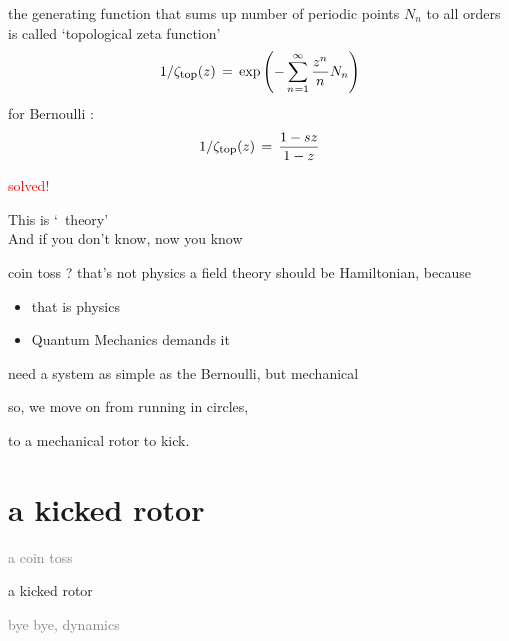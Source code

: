 \begin{frame}{\tzeta}
the {\color{blue}generating function} that sums up number of periodic
points $N_n$ to all orders is called {\color{blue}`topological zeta
function'}
\[
1/\zeta_{\mbox{\footnotesize top}} (z)
 \,=\,  \exp \left(-\sum_{{n_{}}=1}^\infty
\frac{z^{n_{}}}{{n_{}}} N_n
         \right)
\] %
for Bernoulli :
\[
1/\zeta_{\mbox{\footnotesize top}} (z)
\,=\,
\frac{1 -  {s}z}{1 - z}
\]
%
%

\vfill
\hfill {\Huge \textcolor{red}{solved!}}
\vfill

This is `\po\ theory'
\\
 And if you don't know,
 {now you know}

\end{frame}

\begin{frame}{coin toss ? that's not physics}
a field theory should be Hamiltonian, because
\bigskip

\begin{itemize}
  \item
that is physics
  \item
Quantum Mechanics demands it
\end{itemize}
\bigskip

need a system as simple
as the Bernoulli, but {\color{blue}mechanical}
\bigskip

so, we move on from running in circles,

\hfill
to a mechanical {\color{blue}rotor} to kick.
\end{frame}

\section[a kicked rotor]
 {a kicked rotor}

\begin{frame}{}
\begin{enumerate}
              \item \textcolor{gray}{\small
a coin toss
                  }
              \item {\Large
a kicked rotor
                  }\textcolor{gray}{\small
              \item
\catlatt
              \item
bye bye, dynamics
                    }
            \end{enumerate}
\end{frame}


